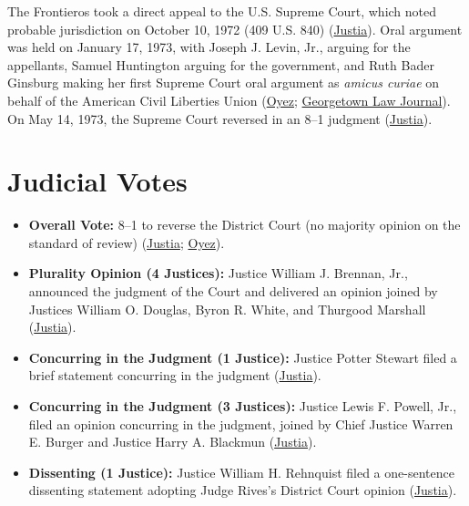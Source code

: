 \documentclass[12pt]{article}
\begin{document}
The Frontieros took a direct appeal to the U.S. Supreme Court, which noted probable jurisdiction on October 10, 1972 (409 U.S. 840) (\href{https://supreme.justia.com/cases/federal/us/411/677/}{Justia}). Oral argument was held on January 17, 1973, with Joseph J. Levin, Jr., arguing for the appellants, Samuel Huntington arguing for the government, and Ruth Bader Ginsburg making her first Supreme Court oral argument as \textit{amicus curiae} on behalf of the American Civil Liberties Union (\href{https://www.oyez.org/cases/1972/71-1694}{Oyez}; \href{https://www.law.georgetown.edu/georgetown-law-journal/wp-content/uploads/sites/26/2022/09/Suk-Justice-Ginsburgs-Cautious-Legacy.pdf}{Georgetown Law Journal}). On May 14, 1973, the Supreme Court reversed in an 8--1 judgment (\href{https://supreme.justia.com/cases/federal/us/411/677/}{Justia}).

\section{Judicial Votes}
\begin{itemize}
    \item \textbf{Overall Vote:} 8--1 to reverse the District Court (no majority opinion on the standard of review) (\href{https://supreme.justia.com/cases/federal/us/411/677/}{Justia}; \href{https://www.oyez.org/cases/1972/71-1694}{Oyez}).
    \item \textbf{Plurality Opinion (4 Justices):} Justice William J. Brennan, Jr., announced the judgment of the Court and delivered an opinion joined by Justices William O. Douglas, Byron R. White, and Thurgood Marshall (\href{https://supreme.justia.com/cases/federal/us/411/677/}{Justia}).
    \item \textbf{Concurring in the Judgment (1 Justice):} Justice Potter Stewart filed a brief statement concurring in the judgment (\href{https://supreme.justia.com/cases/federal/us/411/677/}{Justia}).
    \item \textbf{Concurring in the Judgment (3 Justices):} Justice Lewis F. Powell, Jr., filed an opinion concurring in the judgment, joined by Chief Justice Warren E. Burger and Justice Harry A. Blackmun (\href{https://supreme.justia.com/cases/federal/us/411/677/}{Justia}).
    \item \textbf{Dissenting (1 Justice):} Justice William H. Rehnquist filed a one-sentence dissenting statement adopting Judge Rives's District Court opinion (\href{https://supreme.justia.com/cases/federal/us/411/677/}{Justia}).
\end{itemize}
\end{document}
